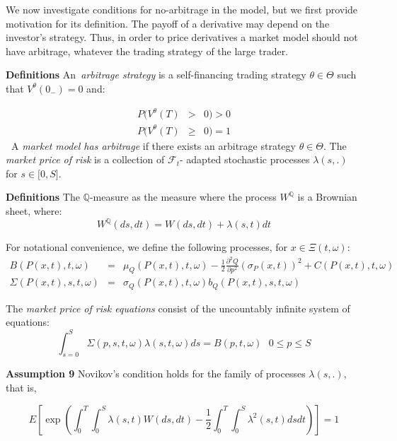 \documentclass{article}
\begin{document}
We now investigate conditions for no-arbitrage in the model, but we first
provide motivation for its definition. The payoff of a derivative may depend
on the investor's strategy. Thus, in order to price derivatives a market
model should not have arbitrage, whatever the trading strategy of the large
trader.

\bigskip

\textbf{Definitions} An\textit{\ arbitrage strategy} is a self-financing
trading strategy $\theta \in \Theta $ such that $V^{\theta }(0_{-})=0$ and:

\begin{eqnarray*}
P(V^{\theta }(T) &>&0)>0 \\
P(V^{\theta }(T) &\geq &0)=1
\end{eqnarray*}%
\bigskip \textbf{\ }A \textit{market model has arbitrage} if there exists an
arbitrage strategy $\theta \in \Theta $. The \textit{market price of risk}
is a collection of $\mathcal{F}_{t}$- adapted stochastic processes $\lambda
(s,.)$ for $s\in \lbrack 0,S]$.

\bigskip

\textbf{Definitions} The $\mathbb{Q}$-measure as the measure where the
process $W^{\mathbb{Q}}$ is a Brownian sheet, where:%
\begin{equation}
W^{\mathbb{Q}}(ds,dt)=W(ds,dt)+\lambda (s,t)dt  \label{WQ}
\end{equation}

For notational convenience, we define the following processes, for $x\in \Xi
(t,\omega )$:%
\begin{eqnarray*}
B(P(x,t),t,\omega ) &=&\mu _{Q}(P(x,t),t,\omega )-\frac{1}{2}\frac{\partial
^{2}Q}{\partial p^{2}}(\sigma _{P}(x,t))^{2}+C(P(x,t),t,\omega ) \\
\Sigma (P(x,t),s,t,\omega ) &=&\sigma _{Q}(P(x,t),t,\omega
)b_{Q}(P(x,t),s,t,\omega )
\end{eqnarray*}

The \textit{market price of risk equations} consist of the uncountably
infinite system of equations: 
\begin{equation}
\int_{s=0}^{S}\Sigma (p,s,t,\omega )\lambda (s,t,\omega )ds=B(p,t,\omega )%
\text{ \ \ \ \ \ }0\leq p\leq S  \label{MPR}
\end{equation}

\textbf{Assumption 9 }Novikov's condition holds for the family of processes $%
\lambda (s,.)$, that is,

\begin{equation}
E[\exp (\int_{0}^{T}\int_{0}^{S}\lambda (s,t)W(ds,dt)-\frac{1}{2}%
\int_{0}^{T}\int_{0}^{S}\lambda ^{2}(s,t)dsdt)]=1  \label{Novikov}
\end{equation}%
\bigskip
\end{document}
